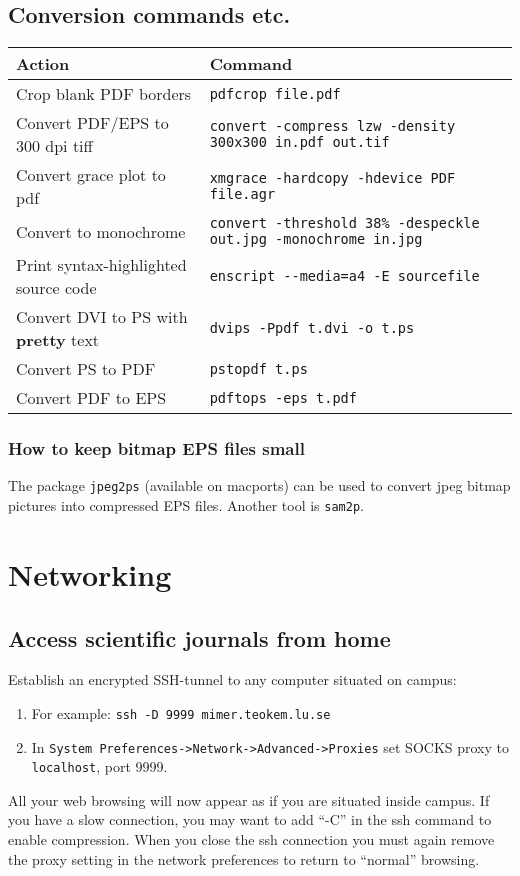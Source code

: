 \documentclass[a4paper,10pt]{article}
\begin{document}
\subsection{Conversion commands etc.}
\begin{table}[h!]
\center
\begin{small}
\begin{tabular}{ll}\hline\hline
Action              & Command \\\hline
Crop blank PDF borders & \verb"pdfcrop file.pdf" \\
Convert PDF/EPS to 300 dpi tiff & \verb"convert -compress lzw -density 300x300 in.pdf out.tif" \\
Convert grace plot to pdf       & \verb"xmgrace -hardcopy -hdevice PDF file.agr"\\
Convert to monochrome           & \verb"convert -threshold 38% -despeckle out.jpg -monochrome in.jpg"\\
Print syntax-highlighted source code & \verb"enscript --media=a4 -E sourcefile"\\
Convert DVI to PS with \textbf{pretty} text & \verb"dvips -Ppdf t.dvi -o t.ps"\\
Convert PS to PDF                           & \verb"pstopdf t.ps"\\
Convert PDF to EPS                          & \verb"pdftops -eps t.pdf"\\
\hline
\end{tabular}\end{small}\end{table}

\subsubsection{How to keep bitmap EPS files small}
The package \verb"jpeg2ps" (available on macports) can be used to convert jpeg bitmap pictures into compressed EPS files. Another tool is \verb"sam2p".



\section{Networking}
\subsection{\label{sec:proxy}Access scientific journals from home}
Establish an encrypted SSH-tunnel to any computer situated on campus:
\begin{enumerate}
\item For example: \verb+ssh -D 9999 mimer.teokem.lu.se+
\item In \verb+System Preferences->Network->Advanced->Proxies+ set SOCKS proxy to \verb+localhost+, port 9999.
\end{enumerate}
All your web browsing will now appear as if you are situated inside campus. If you have a slow connection, you may want to add ``-C'' in the ssh command to enable compression.  When you close the ssh connection you must again remove the proxy setting in the network preferences to return to ``normal'' browsing.
\end{document}
